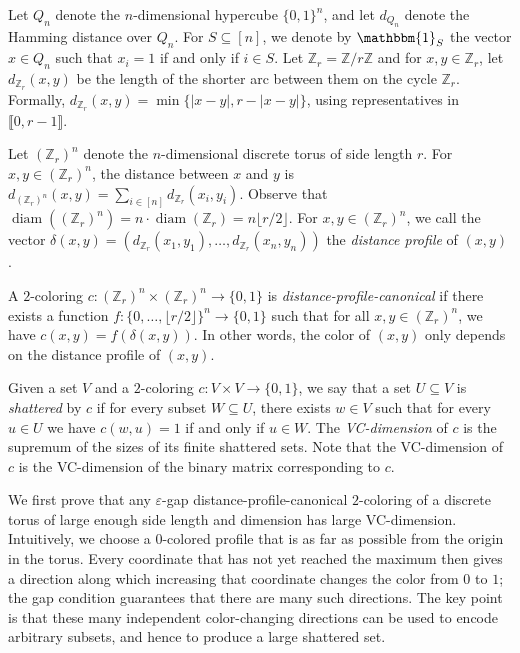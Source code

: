 \documentclass[11pt]{article}
\DeclareMathOperator{\diam}{diam}
\theoremstyle{remark}
\begin{document}
Let $Q_n$ denote the $n$-dimensional hypercube $\{0, 1\}^n$, and let $d_{Q_n}$ denote the Hamming distance over $Q_n$.
For $S \subseteq [n]$, we denote by $\mathbbm{1}_S$ the vector $x \in Q_n$ such that $x_i = 1$ if and only if $i \in S$. 
Let $\mathbb{Z}_r = \mathbb{Z}/r\mathbb{Z}$ and for $x, y \in \mathbb{Z}_r$, let $d_{\mathbb{Z}_r}(x, y)$ be the length of the shorter arc between them on the cycle $\mathbb Z_r$. 
Formally, $d_{\mathbb{Z}_r}(x, y) = \min\{|x-y|, r - |x-y|\}$, using representatives in $\llbracket0, r-1\rrbracket$.

Let $(\mathbb Z_r)^n$ denote the $n$-dimensional discrete torus of side length $r$.
For $x, y \in (\mathbb{Z}_r)^n$, the distance between $x$ and $y$ is $d_{(\mathbb{Z}_r)^n}(x, y) = \sum_{i \in [n]}d_{\mathbb{Z}_r}(x_i, y_i)$.
Observe that $\diam((\mathbb{Z}_r)^n) = n \cdot \diam(\mathbb{Z}_r) = n \lfloor r/2 \rfloor$.
For $x, y \in (\mathbb{Z}_r)^n$, we call the vector $\delta(x, y) = (d_{\mathbb{Z}_r}(x_1, y_1), \ldots, d_{\mathbb{Z}_r}(x_n, y_n))$ the \emph{distance profile} of $(x, y)$.

A $2$-coloring $c : (\mathbb{Z}_{r})^n \times (\mathbb{Z}_{r})^n \to \{0, 1\}$ is \emph{distance-profile-canonical} if there exists a function $f : \{0, \ldots, \lfloor r/2 \rfloor\}^n \to \{0, 1\}$ such that for all $x,y \in (\mathbb{Z}_{r})^n$, we have $c(x, y) = f(\delta(x, y))$. In other words, the color of $(x, y)$ only depends on the distance profile of $(x, y)$.

Given a set $V$ and a $2$-coloring $c : V \times V \to \{0, 1\}$, we say that a set $U \subseteq V$ is \emph{shattered} by $c$ if for every subset $W \subseteq U$, there exists $w \in V$ such that for every $u \in U$ we have $c(w, u) = 1$ if and only if $u \in W$.
The \emph{VC-dimension} of $c$ is the supremum of the sizes of its finite shattered sets.
Note that the VC-dimension of $c$ is the VC-dimension of the binary matrix corresponding to $c$.

We first prove that any $\varepsilon$-gap distance-profile-canonical $2$-coloring of a discrete torus of large enough side length and dimension has large VC-dimension.
Intuitively, we choose a $0$-colored profile that is as far as possible from the origin in the torus. Every coordinate that has not yet reached the maximum then gives a direction along which increasing that coordinate changes the color from $0$ to $1$; the gap condition guarantees that there are many such directions. 
The key point is that these many independent color-changing directions can be used to encode arbitrary subsets, and hence to produce a large shattered set.
\end{document}
